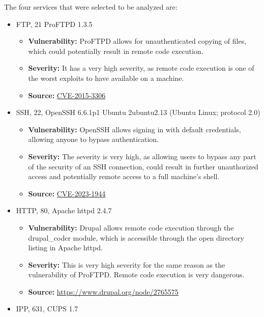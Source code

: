 The four services that were selected to be analyzed are:
\begin{itemize}
    \item FTP, 21 ProFTPD 1.3.5
          \begin{itemize}
              \item \textbf{Vulnerability:} ProFTPD allows for unauthenticated copying of files, which could potentially result in remote code execution.
              \item \textbf{Severity:} It has a very high severity, as remote code execution is one of the worst exploits to have available on a machine.
              \item \textbf{Source:} \href{https://cve.mitre.org/cgi-bin/cvename.cgi?name=CVE-2015-3306}{CVE-2015-3306}
          \end{itemize}
    \item SSH, 22, OpenSSH 6.6.1p1 Ubuntu 2ubuntu2.13 (Ubuntu Linux; protocol 2.0)
          \begin{itemize}
              \item \textbf{Vulnerability:} OpenSSH allows signing in with default credentials, allowing anyone to bypass authentication.
              \item \textbf{Severity:} The severity is very high, as allowing users to bypass any part of the security of an SSH connection, could result in further unauthorized access and potentially remote access to a full machine's shell.
              \item \textbf{Source:} \href{https://cve.mitre.org/cgi-bin/cvename.cgi?name=CVE-2023-1944}{CVE-2023-1944}
          \end{itemize}
    \item HTTP, 80, Apache httpd 2.4.7
          \begin{itemize}
              \item \textbf{Vulnerability:} Drupal allows remote code execution through the drupal\_coder module, which is accessible through the open directory listing in Apache httpd.
              \item \textbf{Severity:} This is very high severity for the same reason as the vulnerability of ProFTPD. Remote code execution is very dangerous.
              \item \textbf{Source:} \href{https://www.drupal.org/node/2765575}{https://www.drupal.org/node/2765575}
          \end{itemize}
    \item IPP, 631, CUPS 1.7
          \begin{itemize}

\end{itemize}
\end{itemize}
